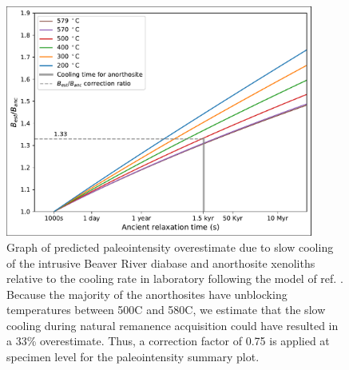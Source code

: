 \begin{figure}
\noindent\includegraphics[width=0.9\textwidth]{figure/Zhang2022/Cooling_rate_correction.pdf}
\centering
\caption[Beaver River anorthosite cooling rate correction for paleointensity estimates]{Graph of predicted paleointensity overestimate due to slow cooling of the intrusive Beaver River diabase and anorthosite xenoliths relative to the cooling rate in laboratory following the model of ref. \citealp{Halgedahl1980a}. Because the majority of the anorthosites have unblocking temperatures between 500\textdegree C and 580\textdegree C, we estimate that the slow cooling during natural remanence acquisition could have resulted in a 33\% overestimate. Thus, a correction factor of 0.75 is applied at specimen level for the paleointensity summary plot.}
\label{fig:SI_PINT_cooling_corrected}
\end{figure}

\clearpage



